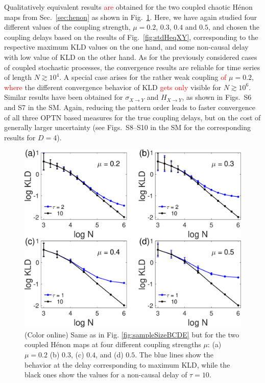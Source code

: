 \documentclass[12pt,aip,cha,reprint,nofootinbib]{revtex4-1}
\begin{document}
Qualitatively equivalent results \textcolor{red}{are} obtained for the two coupled chaotic H\'enon maps from Sec.~\ref{sec:henon} as shown in Fig.~\ref{fig:sampleSizeHenon}. Here, we have again studied four different values of the coupling strength, $\mu = 0.2$, $0.3$, $0.4$ and $0.5$, and chosen the coupling delays based on the results of Fig.~\ref{fig:stdHeqXY}, corresponding to the respective maximum KLD values on the one hand, and some non-causal delay with low value of KLD on the other hand. {\color{red}As for the previously considered cases of coupled stochastic processes, the convergence results are reliable for time series of length $N \gtrsim 10^4$. A special case arises for} the rather weak coupling \textcolor{red}{of} $\mu = 0.2$, \textcolor{red}{where} the different convergence behavior of KLD \textcolor{red}{gets only} visible for $N \gtrsim 10^6$. {\color{red}Similar results have been obtained for $\sigma_{X\to Y}$ and $H_{X\to Y}$, as shown in Figs.~S6 and S7 in the SM. Again, reducing the pattern order leads to faster convergence of all three OPTN based measures for the true coupling delays, but on the cost of generally larger uncertainty (see Figs.~S8--S10 in the SM for the corresponding results for $D=4$).}
\begin{figure}
	\centering
	\includegraphics[width=\columnwidth]{kld_lengthHenon.eps}
\caption{(Color online) Same as in Fig. \ref{fig:sampleSizeBCDE} but for the two coupled H\'enon maps at four different coupling strengths $\mu$: (a) $\mu=0.2$ (b) $0.3$, (c) $0.4$, and (d) $0.5$. The blue lines show the behavior at the delay corresponding to maximum KLD, while the black ones show the values for a non-causal delay of $\tau=10$. \label{fig:sampleSizeHenon}}
\end{figure}
\end{document}
